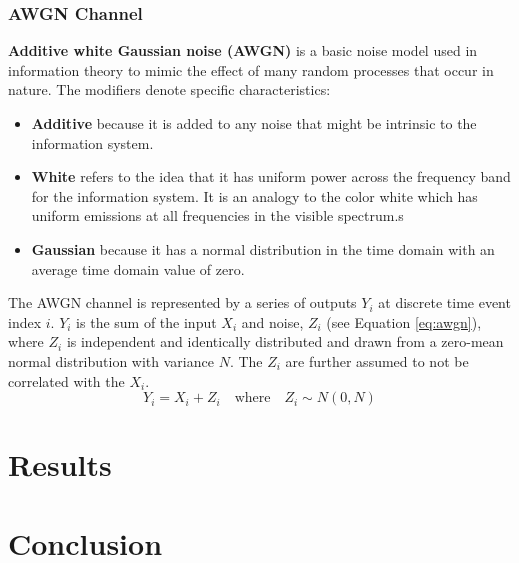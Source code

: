 \documentclass{article}
\begin{document}
	\subsubsection{AWGN Channel}
	\textbf{Additive white Gaussian noise (AWGN)} is a basic noise model used in information theory to mimic the effect of many random processes that occur in nature. The modifiers denote specific characteristics:
	\begin{itemize}
		\item \textbf{Additive} because it is added to any noise that might be intrinsic to the information system.
		\item \textbf{White} refers to the idea that it has uniform power across the frequency band for the information system. It is an analogy to the color white which has uniform emissions at all frequencies in the visible spectrum.s
		\item \textbf{Gaussian} because it has a normal distribution in the time domain with an average time domain value of zero.
	\end{itemize}
	The AWGN channel is represented by a series of outputs $Y_i$ at discrete time event index $i$. $Y_i$ is the sum of the input $X_i$ and noise, $Z_i$ (see Equation \ref{eq:awgn}), where $Z_i$ is independent and identically distributed and drawn from a zero-mean normal distribution with variance $N$. The $Z_i$ are further assumed to not be correlated with the $X_i$.
	\begin{equation}
		 Y_i = X_i + Z_i \quad \textrm{where} \quad Z_i \sim N(0, N)
		 \label{eq:awgn}
	\end{equation}
	\section{Results}
	\section{Conclusion}
	
	 
	 
	
	\appendix
\end{document}
